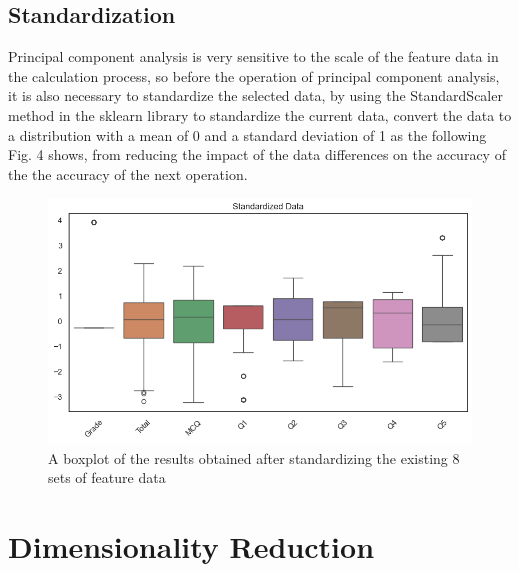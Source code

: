 \documentclass[twocolumn]{IEEEtran}
\begin{document}
\subsection{Standardization}
Principal component analysis is very sensitive to the scale of the feature data in the calculation process, so before the operation of principal component analysis, it is also necessary to standardize the selected data, by using the StandardScaler method in the sklearn library to standardize the current data, convert the data to a distribution with a mean of 0 and a standard deviation of 1 as the following Fig. 4 shows, from reducing the impact of the data differences on the accuracy of the the accuracy of the next operation.
\begin{figure}[H]
    \centering %
    \includegraphics[scale=0.35]{./img/standard.png}
    \caption{A boxplot of the results obtained after standardizing the existing 8 sets of feature data}
\end{figure}

\section{Dimensionality Reduction}
\end{document}
